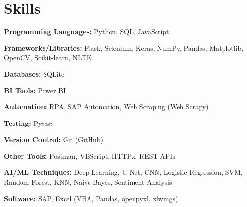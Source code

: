 \section{Skills}
\begin{onecolentry}
\textbf{Programming Languages:} Python, SQL, JavaScript
\end{onecolentry}
\vspace{0.05 cm}
\begin{onecolentry}
\textbf{Frameworks/Libraries:} Flask, Selenium, Keras, NumPy, Pandas, Matplotlib,  OpenCV, Scikit-learn,  NLTK
\end{onecolentry}
\vspace{0.05 cm}
\begin{onecolentry}
\textbf{Databases:} SQLite
\end{onecolentry}
\vspace{0.05 cm}
\begin{onecolentry}
\textbf{BI Tools:} Power BI
\end{onecolentry}
\vspace{0.05 cm}
\begin{onecolentry}
\textbf{Automation:} RPA, SAP Automation, Web Scraping (Web Scrapy)
\end{onecolentry}
\vspace{0.05 cm}
\begin{onecolentry}
\textbf{Testing:} Pytest
\end{onecolentry}
\vspace{0.05 cm}
\begin{onecolentry}
\textbf{Version Control:} Git (GitHub)
\end{onecolentry}
\vspace{0.05 cm}
\begin{onecolentry}
\textbf{Other Tools:}  Postman,  VBScript,  HTTPx, REST APIs
\end{onecolentry}
\vspace{0.05 cm}
\begin{onecolentry}
\textbf{AI/ML Techniques:} Deep Learning, U-Net, CNN, Logistic Regression, SVM, Random Forest, KNN, Naive Bayes,  Sentiment Analysis
\end{onecolentry}
\vspace{0.05 cm}
\begin{onecolentry}
\textbf{Software:} SAP, Excel (VBA, Pandas, openpyxl, xlwings)
\end{onecolentry}



